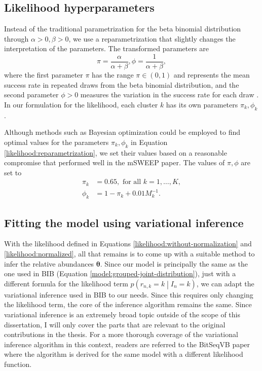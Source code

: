 \documentclass[officiallayout]{tktla}
\begin{document}
\subsection{Likelihood hyperparameters}

Instead of the traditional parametrization for the beta binomial
distribution through $\alpha >0, \beta > 0$, we use a
reparametrization that slightly changes the interpretation of the
parameters. The transformed parameters are
\begin{equation}
  \label{likelihood:reparametrization}
  \pi = \frac{\alpha}{\alpha + \beta}, \phi = \frac{1}{\alpha + \beta},
\end{equation}
where the first parameter $\pi$ has the range $\pi \in \left(0,
1\right)$ and represents the mean success rate in repeated draws from
the beta binomial distribution, and the second parameter $\phi > 0$
measures the variation in the success rate for each draw
\citep{griffiths1973maximum}. In our formulation for the likelihood,
each cluster $k$ has its own parameters $\pi_{k}, \phi_{k}$.

Although methods such as Bayesian optimization could be employed to
find optimal values for the parameters $\pi_{k}, \phi_{k}$ in Equation
\ref{likelihood:reparametrization}, we set their values based on a
reasonable compromise that performed well in the mSWEEP paper. The
values of $\pi, \phi$ are set to
\begin{equation}
  \begin{aligned}
    \pi_k &= 0.65, \text{ for all } k = 1, \dots, K, \\
    \phi_{k} &= 1 - \pi_{k} + 0.01M_{k}^{-1}.
  \end{aligned}
\end{equation}

\subsection{Fitting the model using variational inference}

With the likelihood defined in Equations
\ref{likelihood:without-normalization} and
\ref{likelihood:normalized}, all that remains is to come up with a
suitable method to infer the relative abundances
$\boldsymbol\theta$. Since our model is principally the same as the
one used in BIB (Equation \ref{model:grouped-joint-distribution}),
just with a different formula for the likelihood term $p\left(r_{n, k}
= k \middle| I_{n} = k\right)$, we can adapt the variational inference
used in BIB to our needs. Since this requires only changing the
likelihood term, the core of the inference algorithm remains the
same. Since variational inference is an extremely broad topic outside
of the scope of this dissertation, I will only cover the parts that
are relevant to the original contributions in the thesis. For a more
thorough coverage of the variational inference algorithm in this
context, readers are referred to the BitSeqVB paper \citep{hensman2015fast} where the
algorithm is derived for the same model with a different likelihood
function.
\end{document}
